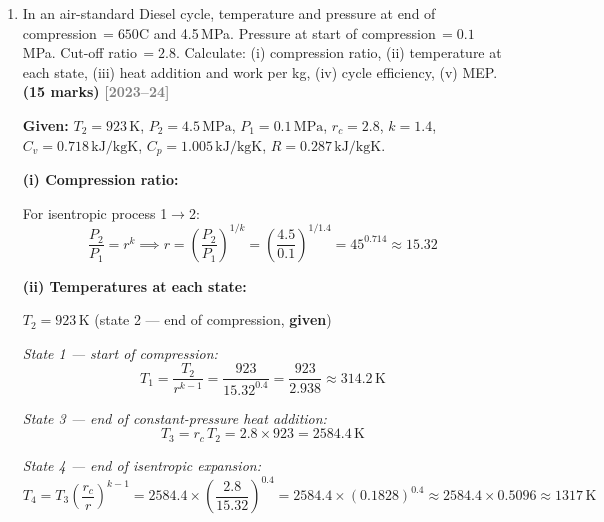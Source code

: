 \documentclass[12pt,a3paper]{article}
\newcommand{\yr}[1]{\hfill\textcolor{gray}{\small\textbf{[#1]}}}
\newcommand{\mk}[1]{\textcolor{orange!70!black}{\small\textbf{(#1 marks)}}}
\begin{document}
\begin{enumerate}
\begin{tcolorbox}[enhanced,breakable,ansbox,colback=cB!4,colframe=cB,
  boxrule=0.8pt,arc=5pt,
  title={\textbf{Answer}},fonttitle=\bfseries\color{white},colbacktitle=cB]
\textbf{(iv) Clearance volume per cylinder:}
\[
  V_c = \frac{V_{s,1}}{r-1} = \frac{375}{11}
  \approx \boxed{34.1\,\text{cm}^3}
\]

\textbf{(v) Power strokes per minute:}\\
In a 4-stroke engine, each cylinder fires once every 2 revolutions.
\[
  \text{Power strokes/min} = \frac{N}{2}\times n
  = \frac{3000}{2}\times 8
  = \boxed{12{,}000\;\text{power strokes/min}}
\]

\end{tcolorbox}

\item \label{qlabel:A2-Q12}
In an air-standard Diesel cycle, temperature and pressure at end of compression\,$= 650$\textdegree C and 4.5\,MPa. Pressure at start of compression\,$= 0.1$\,MPa. Cut-off ratio\,$= 2.8$. Calculate: (i) compression ratio, (ii) temperature at each state, (iii) heat addition and work per kg, (iv) cycle efficiency, (v) MEP. \mk{15}
\yr{2023--24}

\begin{tcolorbox}[enhanced,breakable,ansbox,colback=cB!4,colframe=cB,
  boxrule=0.8pt,arc=5pt,
  title={\textbf{Answer}},fonttitle=\bfseries\color{white},colbacktitle=cB]

\textbf{Given:}
$T_2 = 923\,\text{K}$, $P_2 = 4.5\,\text{MPa}$, $P_1 = 0.1\,\text{MPa}$,
$r_c = 2.8$, $k = 1.4$, $C_v = 0.718\,\text{kJ/kgK}$, $C_p = 1.005\,\text{kJ/kgK}$, $R = 0.287\,\text{kJ/kgK}$.

\textbf{(i) Compression ratio:}

For isentropic process 1$\to$2:
\[
  \frac{P_2}{P_1} = r^k
  \implies r = \left(\frac{P_2}{P_1}\right)^{1/k}
  = \left(\frac{4.5}{0.1}\right)^{1/1.4}
  = 45^{0.714}
  \approx \boxed{15.32}
\]

\textbf{(ii) Temperatures at each state:}

$T_2 = 923\,\text{K}$ (state 2 — end of compression, \textbf{given})

\textit{State 1 — start of compression:}
\[
  T_1 = \frac{T_2}{r^{k-1}} = \frac{923}{15.32^{0.4}} = \frac{923}{2.938} \approx \boxed{314.2\,\text{K}}
\]

\textit{State 3 — end of constant-pressure heat addition:}
\[
  T_3 = r_c\,T_2 = 2.8\times923 = \boxed{2584.4\,\text{K}}
\]

\textit{State 4 — end of isentropic expansion:}
\[
  T_4 = T_3\left(\frac{r_c}{r}\right)^{k-1}
  = 2584.4\times\left(\frac{2.8}{15.32}\right)^{0.4}
  = 2584.4\times(0.1828)^{0.4}
  \approx 2584.4\times0.5096
  \approx \boxed{1317\,\text{K}}
\]


\end{tcolorbox}
\end{enumerate}
\end{document}
